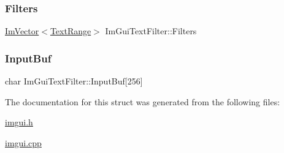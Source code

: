 \mbox{\label{struct_im_gui_text_filter_a5a930a339a9384e6bfadfa56a7c111fd}} 
\subsubsection{\texorpdfstring{Filters}{Filters}}
{\footnotesize\ttfamily \mbox{\hyperlink{class_im_vector}{Im\+Vector}}$<$\mbox{\hyperlink{struct_im_gui_text_filter_1_1_text_range}{Text\+Range}}$>$ Im\+Gui\+Text\+Filter\+::\+Filters}

\mbox{\label{struct_im_gui_text_filter_ad070acb1038199dd4e8f5d010c5cb5ba}} 
\subsubsection{\texorpdfstring{Input\+Buf}{InputBuf}}
{\footnotesize\ttfamily char Im\+Gui\+Text\+Filter\+::\+Input\+Buf\mbox{[}256\mbox{]}}



The documentation for this struct was generated from the following files\+:\begin{DoxyCompactItemize}
\item 
\mbox{\hyperlink{imgui_8h}{imgui.\+h}}\item 
\mbox{\hyperlink{imgui_8cpp}{imgui.\+cpp}}\end{DoxyCompactItemize}

